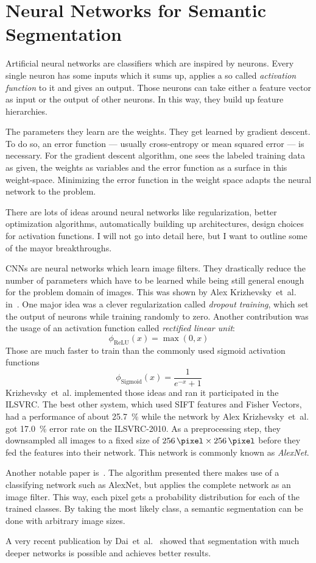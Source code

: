 
\section{Neural Networks for Semantic Segmentation}

Artificial neural networks are classifiers which are inspired by neurons.
Every single neuron has some inputs which it sums up, applies a so called
\textit{activation function} to it and gives an output. Those neurons can take
either a feature vector as input or the output of other neurons. In this way,
they build up feature hierarchies.

The parameters they learn are the weights. They get learned by gradient
descent. To do so, an error function --- usually cross-entropy or mean squared
error --- is necessary. For the gradient descent algorithm, one sees the
labeled training data as given, the weights as variables and the error function
as a surface in this weight-space. Minimizing the error function in the weight
space adapts the neural network to the problem.

There are lots of ideas around neural networks like regularization, better
optimization algorithms, automatically building up architectures, design
choices for activation functions. I will not go into detail here, but I want to
outline some of the mayor breakthroughs.

\Glspl{CNN} are neural networks which learn image filters. They drastically
reduce the number of parameters which have to be learned while being still
general enough for the problem domain of images. This was shown by Alex
Krizhevsky~et~al. in~\cite{krizhevsky2012imagenet}. One major idea was a clever
regularization called \textit{dropout training}, which set the output of neurons
while training randomly to zero. Another contribution was the usage of an activation
function called \textit{rectified linear unit}:
\[\phi_{\text{ReLU}}(x) = \max(0, x)\]
Those are much faster to train than the commonly used sigmoid activation functions
\[\phi_{\text{Sigmoid}}(x) = \frac{1}{e^{-x} + 1}\] %
Krizhevsky~et~al. implemented those ideas and ran it participated in the
\gls{ILSVRC}. The best other system, which used SIFT features and Fisher
Vectors, had a performance of about \SI{25.7}{\percent} while the network by
Alex Krizhevsky~et~al. got \SI{17.0}{\percent} error rate on the ILSVRC-2010.
As a preprocessing step, they downsampled all images to a fixed
size of $\SI{256}{\pixel} \times \SI{256}{\pixel}$ before they fed the features
into their network. This network is commonly known as \textit{AlexNet}.

Another notable paper is~\cite{long2014fully}. The algorithm presented there
makes use of a classifying network such as AlexNet, but applies the complete
network as an image filter. This way, each pixel gets a probability
distribution for each of the trained classes. By taking the most likely class,
a semantic segmentation can be done with arbitrary image sizes.

A very recent publication by Dai~et~al.~\cite{dai2015instance} showed that
segmentation with much deeper networks is possible and achieves better results.
